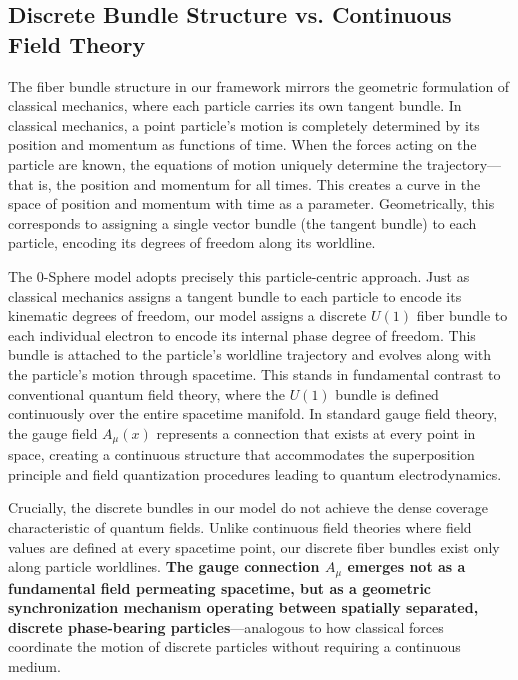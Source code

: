 \documentclass[%
 reprint,
 amsmath,amssymb,
 aps,
]{revtex4-1}
\numberwithin{equation}{section}%
\begin{document}
\subsection{Discrete Bundle Structure vs. Continuous Field Theory}

The fiber bundle structure in our framework mirrors the geometric formulation of classical mechanics, where each particle carries its own tangent bundle. In classical mechanics, a point particle's motion is completely determined by its position and momentum as functions of time. When the forces acting on the particle are known, the equations of motion uniquely determine the trajectory—that is, the position and momentum for all times. This creates a curve in the space of position and momentum with time as a parameter. Geometrically, this corresponds to assigning a single vector bundle (the tangent bundle) to each particle, encoding its degrees of freedom along its worldline.

The 0-Sphere model adopts precisely this particle-centric approach. Just as classical mechanics assigns a tangent bundle to each particle to encode its kinematic degrees of freedom, our model assigns a discrete $U(1)$ fiber bundle to each individual electron to encode its internal phase degree of freedom. This bundle is attached to the particle's worldline trajectory and evolves along with the particle's motion through spacetime. This stands in fundamental contrast to conventional quantum field theory, where the $U(1)$ bundle is defined continuously over the entire spacetime manifold. In standard gauge field theory, the gauge field $A_\mu(x)$ represents a connection that exists at every point in space, creating a continuous structure that accommodates the superposition principle and field quantization procedures leading to quantum electrodynamics.

Crucially, the discrete bundles in our model do not achieve the dense coverage characteristic of quantum fields. Unlike continuous field theories where field values are defined at every spacetime point, our discrete fiber bundles exist only along particle worldlines. \textbf{The gauge connection $A_\mu$ emerges not as a fundamental field permeating spacetime, but as a geometric synchronization mechanism operating between spatially separated, discrete phase-bearing particles}—analogous to how classical forces coordinate the motion of discrete particles without requiring a continuous medium.
\end{document}
